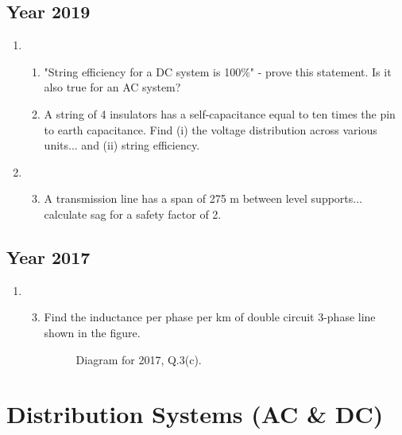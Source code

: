 \documentclass[12pt, a4paper]{article}
\begin{document}
	\subsection{Year 2019}
	\begin{enumerate}[label=\textbf{Q\arabic*.}, wide, labelindent=0pt, start=1]
		\item 
		\begin{enumerate}[label=\textbf{(\alph*)}]
			\item "String efficiency for a DC system is 100\%" - prove this statement. Is it also true for an AC system?
			\item A string of 4 insulators has a self-capacitance equal to ten times the pin to earth capacitance. Find (i) the voltage distribution across various units... and (ii) string efficiency.
		\end{enumerate}
		\item 
		\begin{enumerate}[label=\textbf{(\alph*)}]
			\setcounter{enumii}{2} %
			\item A transmission line has a span of 275 m between level supports... calculate sag for a safety factor of 2.
		\end{enumerate}
	\end{enumerate}
	
	\subsection{Year 2017}
	\begin{enumerate}[label=\textbf{Q.3}, wide, labelindent=0pt, start=3]
		\item 
		\begin{enumerate}[label=\textbf{(\alph*)}]
			\setcounter{enumii}{2} %
			\item Find the inductance per phase per km of double circuit 3-phase line shown in the figure.
			\begin{figure}[h!]
				\centering
				\caption{Diagram for 2017, Q.3(c).}
			\end{figure}
		\end{enumerate}
	\end{enumerate}
	
	
	\newpage
	\section{Distribution Systems (AC \& DC)}
\end{document}
